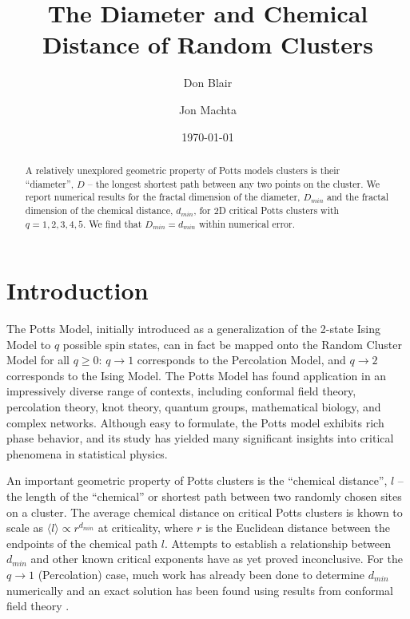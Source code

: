 \documentclass[pre,preprint]{revtex4}
\begin{document}
\title{The Diameter and Chemical Distance of Random Clusters}

\author{Don Blair}
\author{Jon Machta}

\date{\today}


\begin{abstract}
 A relatively unexplored geometric property of Potts models clusters is their ``diameter'', $D$ -- the longest shortest path between any two points on the cluster. We report numerical results for the fractal dimension of the diameter, $D_{min}$ and the fractal dimension of the chemical distance, $d_{min}$, for 2D critical Potts clusters with $q=1,2,3,4,5$. We find that $D_{min} = d_{min}$ within numerical error.
\end{abstract}

\maketitle 

\section{Introduction}

The Potts Model, initially introduced as a generalization of the 2-state Ising Model to $q$ possible spin states, can in fact be mapped onto the Random Cluster Model for all $q \ge 0$: $q \to 1$ corresponds to the Percolation Model, and $q \to 2$ corresponds to the Ising Model.  The Potts Model has found application in an impressively diverse range of contexts, including conformal field theory, percolation theory, knot theory, quantum groups, mathematical biology, and complex networks. Although easy to formulate, the Potts model exhibits rich phase behavior, and its study has yielded many significant insights into critical phenomena in statistical physics.

An important geometric property of Potts clusters is the ``chemical distance'', $l$ -- the length of the ``chemical'' or shortest path between two randomly chosen sites on a cluster.  The average chemical distance on critical Potts clusters is khown to scale as $\langle l \rangle \propto r^{d_{min}}$ at criticality, where $r$ is the Euclidean distance between the endpoints of the chemical path $l$. Attempts to establish a relationship between $d_{min}$ and other known critical exponents have as yet proved inconclusive.  For the $q \to 1$ (Percolation) case, much work has already been done to determine $d_{min}$ numerically \cite{Gr83, HrSt88} and an exact solution has been found using results from conformal field theory \cite{Zi99}.
\end{document}
